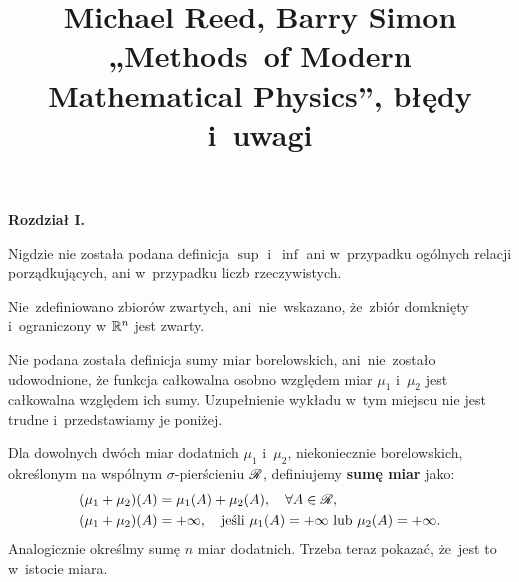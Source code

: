 \documentclass[a4paper,11pt]{article}
\title{ %
  Michael Reed, Barry Simon \\
  „Methods~of Modern Mathematical Physics”, błędy i~uwagi}
\begin{document}





\maketitle %









\noindent
\textbf{Rozdział I.}

\vspace{\spaceFour}



\start Nigdzie nie została podana definicja $\sup$ i~$\inf$ ani
w~przypadku ogólnych relacji porządkujących, ani w~przypadku liczb
rzeczywistych. %

\vspace{\spaceFour}



\start Nie~zdefiniowano zbiorów zwartych, ani~nie~wskazano, że~zbiór
domknięty i~ograniczony w $\mathbb{R}^{ n }$ jest zwarty.

\vspace{\spaceFour}



\start Nie podana została definicja sumy miar borelowskich,
ani~nie~zostało udowodnione, że funkcja całkowalna osobno względem
miar $\mu_{ 1 }$ i~$\mu_{ 2 }$ jest całkowalna względem ich sumy.
Uzupełnienie wykładu w~tym miejscu nie jest trudne i~przedstawiamy je
poniżej.

Dla dowolnych dwóch miar dodatnich $\mu_{ 1 }$ i~$\mu_{ 2 }$,
niekoniecznie borelowskich, określonym na wspólnym $\sigma$-pierścieniu $\mathcal{R}$, definiujemy \textbf{sumę miar} jako:
\begin{equation}
  \label{eq:RS-VolI-s0-01}
  \begin{split}
    ( \mu_{ 1 } + \mu_{ 2 } )( A )
    &=
      \mu_{ 1 }( A ) + \mu_{ 2 }( A ), \quad
      \forall A \in \mathcal{R}, \\
    ( \mu_{ 1 } + \mu_{ 2 } )( A )
    &=
      +\infty, \quad \textrm{jeśli } \mu_{ 1 }( A ) = +\infty \textrm{ lub }
      \mu_{ 2 }( A ) = +\infty.
  \end{split}
\end{equation}
Analogicznie określmy sumę $n$ miar dodatnich. Trzeba teraz pokazać,
że~jest to w~istocie miara.
\end{document}
